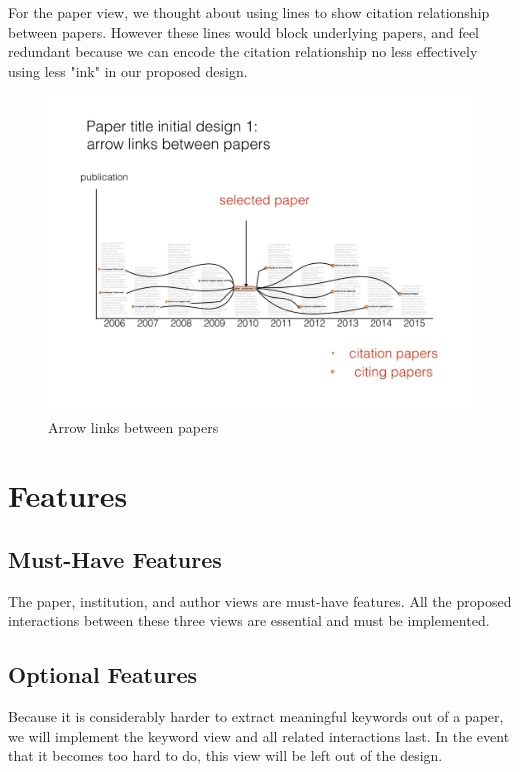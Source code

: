 \documentclass[dvips,12pt]{article}
\begin{document}
For the paper view, we thought about using lines to show citation relationship between papers. However these lines would block underlying papers, and feel redundant because we can encode the citation relationship no less effectively using less "ink" in our proposed design.

\begin{figure}[htb!]
    \centering
    \includegraphics[width=160mm]{visproposalDrawing_page_Part_11.pdf}
    \caption{Arrow links between papers}
    \label{fig:zoomable_ring}
\end{figure}

\section{Features}
\subsection{Must-Have Features}
The paper, institution, and author views are must-have features. All the proposed interactions between these three views are essential and must be implemented.
\subsection{Optional Features}
Because it is considerably harder to extract meaningful keywords out of a paper, we will implement the keyword view and all related interactions last. In the event that it becomes too hard to do, this view will be left out of the design.
\end{document}
